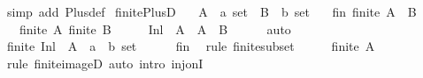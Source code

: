 \begin{isabellebody}
\isamarkupfalse%
\ {\isacharparenleft}{\kern0pt}simp\ add{\isacharcolon}{\kern0pt}\ Plus{\isacharunderscore}{\kern0pt}def{\isacharparenright}{\kern0pt}%
\endisatagproof
{\isafoldproof}%
%
\isadelimproof
\isanewline
%
\endisadelimproof
\isanewline
{}\isamarkupfalse%
\ finite{\isacharunderscore}{\kern0pt}PlusD{\isacharcolon}{\kern0pt}\isanewline
\ \ \ A\ {\isacharcolon}{\kern0pt}{\isacharcolon}{\kern0pt}\ {\isachardoublequoteopen}{\isacharprime}{\kern0pt}a\ set{\isachardoublequoteclose}\ \ B\ {\isacharcolon}{\kern0pt}{\isacharcolon}{\kern0pt}\ {\isachardoublequoteopen}{\isacharprime}{\kern0pt}b\ set{\isachardoublequoteclose}\isanewline
\ \ \ fin{\isacharcolon}{\kern0pt}\ {\isachardoublequoteopen}finite\ {\isacharparenleft}{\kern0pt}A\ {\isacharless}{\kern0pt}{\isacharplus}{\kern0pt}{\isachargreater}{\kern0pt}\ B{\isacharparenright}{\kern0pt}{\isachardoublequoteclose}\isanewline
\ \ \ {\isachardoublequoteopen}finite\ A{\isachardoublequoteclose}\ {\isachardoublequoteopen}finite\ B{\isachardoublequoteclose}\isanewline
%
\isadelimproof
%
\endisadelimproof
%
\isatagproof
{}\isamarkupfalse%
\ {\isacharminus}{\kern0pt}\isanewline
\ \ \isamarkupfalse%
\ {\isachardoublequoteopen}Inl\ {\isacharbackquote}{\kern0pt}\ A\ {\isasymsubseteq}\ A\ {\isacharless}{\kern0pt}{\isacharplus}{\kern0pt}{\isachargreater}{\kern0pt}\ B{\isachardoublequoteclose}\isanewline
\ \ \ \ \isamarkupfalse%
\ auto\isanewline
\ \ \isamarkupfalse%
\ \isamarkupfalse%
\ {\isachardoublequoteopen}finite\ {\isacharparenleft}{\kern0pt}Inl\ {\isacharbackquote}{\kern0pt}\ A\ {\isacharcolon}{\kern0pt}{\isacharcolon}{\kern0pt}\ {\isacharparenleft}{\kern0pt}{\isacharprime}{\kern0pt}a\ {\isacharplus}{\kern0pt}\ {\isacharprime}{\kern0pt}b{\isacharparenright}{\kern0pt}\ set{\isacharparenright}{\kern0pt}{\isachardoublequoteclose}\isanewline
\ \ \ \ \isamarkupfalse%
\ fin\ \isamarkupfalse%
\ {\isacharparenleft}{\kern0pt}rule\ finite{\isacharunderscore}{\kern0pt}subset{\isacharparenright}{\kern0pt}\isanewline
\ \ \isamarkupfalse%
\ \isamarkupfalse%
\ {\isachardoublequoteopen}finite\ A{\isachardoublequoteclose}\isanewline
\ \ \ \ \isamarkupfalse%
\ {\isacharparenleft}{\kern0pt}rule\ finite{\isacharunderscore}{\kern0pt}imageD{\isacharparenright}{\kern0pt}\ {\isacharparenleft}{\kern0pt}auto\ intro{\isacharcolon}{\kern0pt}\ inj{\isacharunderscore}{\kern0pt}onI{\isacharparenright}{\kern0pt}\isanewline

\end{isabellebody}
